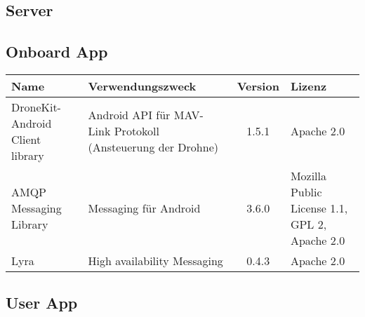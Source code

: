 \subsection{Server}


\subsection{Onboard App}
\begin{tabularx}{\textwidth}{|X|X|c|X|}
	\hline
	\textbf{Name} & \textbf{Verwendungszweck} & \textbf{Version} & \textbf{Lizenz} \\
	\hline \hline
	DroneKit-Android Client library & Android API für MAV-Link Protokoll (Ansteuerung der Drohne) & 1.5.1 & Apache 2.0\\
	\hline 
	AMQP Messaging Library & Messaging für Android & 3.6.0 &  Mozilla Public License 1.1, GPL 2,  Apache 2.0 \\
	\hline 
	Lyra  & High availability Messaging & 0.4.3 &  Apache 2.0 \\
	\hline 
\end{tabularx}
\subsection{User App}


